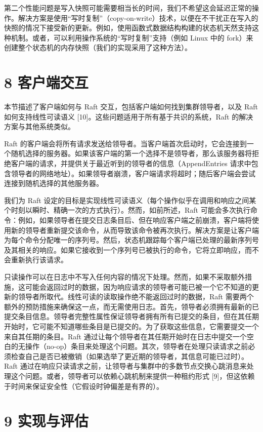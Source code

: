 \documentclass[12pt,a4paper]{report} %
\begin{document}
第二个性能问题是写入快照可能需要相当长的时间，我们不希望这会延迟正常的操作。解决方案是使用“写时复制”（copy-on-write）技术，以便在不干扰正在写入的快照的情况下接受新的更新。例如，使用函数式数据结构构建的状态机天然支持这种机制。或者，可以利用操作系统的“写时复制”支持（例如 Linux 中的 fork）来创建整个状态机的内存快照（我们的实现采用了这种方法）。

\section*{8 客户端交互}

本节描述了客户端如何与 Raft 交互，包括客户端如何找到集群领导者，以及 Raft 如何支持线性可读语义 [10]。这些问题适用于所有基于共识的系统，Raft 的解决方案与其他系统类似。

Raft 的客户端会将所有请求发送给领导者。当客户端首次启动时，它会连接到一个随机选择的服务器。如果该客户端的第一个选择不是领导者，那么该服务器将拒绝客户端的请求，并提供关于最近听到的领导者的信息（AppendEntries 请求中包含领导者的网络地址）。如果领导者崩溃，客户端请求将超时；随后客户端会尝试连接到随机选择的其他服务器。

我们为 Raft 设定的目标是实现线性可读语义（每个操作似乎在调用和响应之间某个时刻以瞬时、精确一次的方式执行）。然而，如前所述，Raft 可能会多次执行命令：例如，如果领导者在提交日志条目后、但在响应客户端之前崩溃，客户端将使用新的领导者重新提交该命令，从而导致该命令被再次执行。解决方案是让客户端为每个命令分配唯一的序列号。然后，状态机跟踪每个客户端已处理的最新序列号及其相关的响应。如果它接收到一个序列号已被执行的命令，它将立即响应，而不会重新执行该请求。

只读操作可以在日志中不写入任何内容的情况下处理。然而，如果不采取额外措施，这可能会返回过时的数据，因为响应请求的领导者可能已被一个它不知道的更新的领导者所取代。线性可读的读取操作绝不能返回过时的数据，Raft 需要两个额外的预防措施来确保这一点，而无需使用日志。首先，领导者必须拥有最新的已提交条目信息。领导者完整性属性保证领导者拥有所有已提交的条目，但在其任期开始时，它可能不知道哪些条目是已提交的。为了获取这些信息，它需要提交一个来自其任期的条目。Raft 通过让每个领导者在其任期开始时在日志中提交一个空白的无操作（no-op）条目来处理这个问题。其次，领导者在处理只读请求之前必须检查自己是否已被撤销（如果选举了更近期的领导者，其信息可能已过时）。Raft 通过在响应只读请求之前，让领导者与集群中的多数节点交换心跳消息来处理这个问题。或者，领导者可以依赖心跳机制来提供一种租约形式 [9]，但这依赖于时间来保证安全性（它假设时钟偏差是有界的）。

\section*{9 实现与评估}
\end{document}
